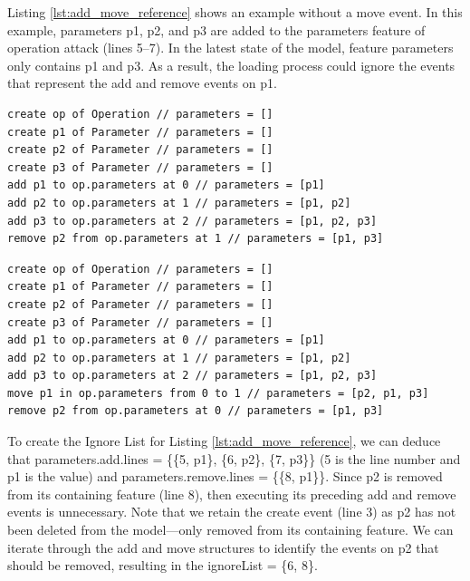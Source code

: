 Listing \ref{lst:add_move_reference} shows an example without a \textsf{move} event. In this example, parameters \textsf{p1}, \textsf{p2}, and \textsf{p3} are added to the \textsf{parameters} feature of operation \textsf{attack} (lines 5–7). In the latest state of the model, feature \textsf{parameters} only contains \textsf{p1} and \textsf{p3}. As a result, the loading process could ignore the events that represent the \textsf{add} and \textsf{remove} events on \textsf{p1}.

\vspace{-20pt}
\begin{lstlisting}[style=eol,caption={A CBP of add and remove operations.},label=lst:add_move_reference]
create op of Operation // parameters = []
create p1 of Parameter // parameters = []
create p2 of Parameter // parameters = []
create p3 of Parameter // parameters = []
add p1 to op.parameters at 0 // parameters = [p1]
add p2 to op.parameters at 1 // parameters = [p1, p2]
add p3 to op.parameters at 2 // parameters = [p1, p2, p3]
remove p2 from op.parameters at 1 // parameters = [p1, p3]
\end{lstlisting}

\vspace{-20pt}
\begin{lstlisting}[style=eol,caption={A CBP representation of add, move, and remove operations.},label=lst:add_remove_move_reference]
create op of Operation // parameters = []
create p1 of Parameter // parameters = []
create p2 of Parameter // parameters = []
create p3 of Parameter // parameters = []
add p1 to op.parameters at 0 // parameters = [p1]
add p2 to op.parameters at 1 // parameters = [p1, p2]
add p3 to op.parameters at 2 // parameters = [p1, p2, p3]
move p1 in op.parameters from 0 to 1 // parameters = [p2, p1, p3]
remove p2 from op.parameters at 0 // parameters = [p1, p3]
\end{lstlisting}

To create the Ignore List for Listing \ref{lst:add_move_reference}, we can deduce that \textsf{parameters}.\textsf{add}.\textsf{lines} = \{\{5, \textsf{p1}\}, \{6, \textsf{p2}\}, \{7, \textsf{p3}\}\} (5 is the line number and \textsf{p1} is the value) and \textsf{parameters}.\textsf{remove}.\textsf{lines} = \{\{8, \textsf{p1}\}\}. Since \textsf{p2} is removed from its containing feature (line 8), then executing its preceding add and remove events is unnecessary. Note that we retain the \textsf{create} event (line 3) as \textsf{p2} has not been deleted from the model—only removed from its containing feature. We can iterate through the add and move structures to identify the events on \textsf{p2} that should be removed, resulting in the \textsf{ignoreList} = \{6, 8\}.


